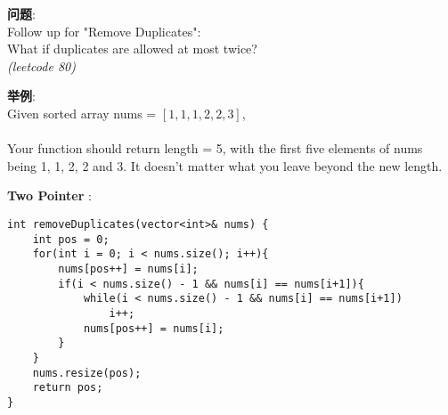     
\begin{description}
    \item{\textbf{问题}}:\\
Follow up for "Remove Duplicates": \\
What if duplicates are allowed at most twice? \\
\textit{(leetcode 80)}
    \item{\textbf{举例}}:\\
Given sorted array nums = $[1,1,1,2,2,3]$, \\
\\
Your function should return length = 5, with the first five elements of nums being 1, 1, 2, 2 and 3. It doesn't matter what you leave beyond the new length. \\
    \item{\textbf{Two Pointer}} : 
    \begin{lstlisting}
int removeDuplicates(vector<int>& nums) {
	int pos = 0;
	for(int i = 0; i < nums.size(); i++){
		nums[pos++] = nums[i];
		if(i < nums.size() - 1 && nums[i] == nums[i+1]){
			while(i < nums.size() - 1 && nums[i] == nums[i+1])
				i++;
			nums[pos++] = nums[i];
		}
	}
	nums.resize(pos);
	return pos;
}
    \end{lstlisting}
\end{description}
